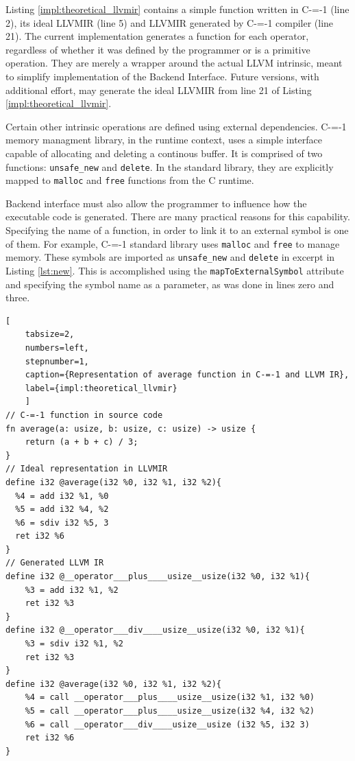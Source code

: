 Listing \ref{impl:theoretical_llvmir} contains a simple function written in C-=-1 (line 2), its ideal LLVMIR (line 5) and LLVMIR generated by C-=-1 compiler (line 21).
The current implementation generates a function for each operator, regardless of whether it was defined by the programmer or is a primitive operation.
They are merely a wrapper around the actual LLVM intrinsic, meant to simplify implementation of the Backend Interface.
Future versions, with additional effort, may generate the ideal LLVMIR from line 21 of Listing \ref{impl:theoretical_llvmir}.

Certain other intrinsic operations are defined using external dependencies.
C-=-1 memory managment library, in the runtime context, uses a simple interface capable of allocating and deleting a continous buffer.
It is comprised of two functions: \lstinline{unsafe_new} and \lstinline{delete}.
In the standard library, they are explicitly mapped to \lstinline{malloc} and \lstinline{free} functions from the C runtime.

Backend interface must also allow the programmer to influence how the executable code is generated.
There are many practical reasons for this capability.
Specifying the name of a function, in order to link it to an external symbol is one of them.
For example, C-=-1 standard library uses \lstinline{malloc} and \lstinline{free} to manage memory.
These symbols are imported as \lstinline{unsafe_new} and \lstinline{delete} in excerpt in Listing \ref{lst:new}.
This is accomplished using the \lstinline{mapToExternalSymbol} attribute and specifying the symbol name as a parameter, as was done in lines zero and three.

\begin{minipage}{\linewidth}
	\begin{lstlisting}[
	tabsize=2,
	numbers=left,
	stepnumber=1,
	caption={Representation of average function in C-=-1 and LLVM IR},
	label={impl:theoretical_llvmir}
	]
// C-=-1 function in source code
fn average(a: usize, b: usize, c: usize) -> usize {
	return (a + b + c) / 3;
}
// Ideal representation in LLVMIR
define i32 @average(i32 %0, i32 %1, i32 %2){
  %4 = add i32 %1, %0
  %5 = add i32 %4, %2
  %6 = sdiv i32 %5, 3
  ret i32 %6
}
// Generated LLVM IR
define i32 @__operator___plus____usize__usize(i32 %0, i32 %1){
	%3 = add i32 %1, %2
	ret i32 %3
}
define i32 @__operator___div____usize__usize(i32 %0, i32 %1){
	%3 = sdiv i32 %1, %2
	ret i32 %3
}
define i32 @average(i32 %0, i32 %1, i32 %2){
	%4 = call __operator___plus____usize__usize(i32 %1, i32 %0)
	%5 = call __operator___plus____usize__usize(i32 %4, i32 %2)
	%6 = call __operator___div____usize__usize (i32 %5, i32 3)
	ret i32 %6
}
\end{lstlisting}
\end{minipage}



